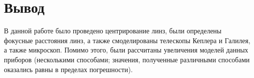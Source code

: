 \documentclass[a4paper,12pt]{article} %
\begin{document}
\section{Вывод}
В данной работе было проведено центрирование линз, были определены фокусные расстояния линз, а также смоделированы телескопы Кеплера и Галилея, а также микроскоп. Помимо этого, были рассчитаны увеличения моделей данных приборов (несколькими способами; значения, полученные различными способами оказались равны в пределах погрешности).
\end{document}
